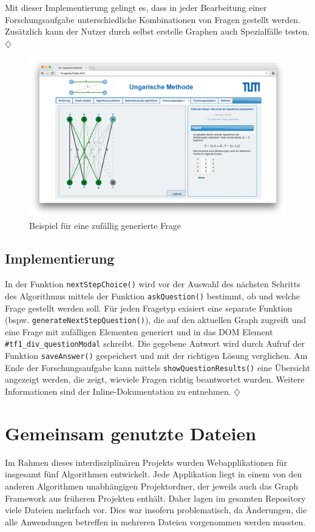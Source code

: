 Mit dieser Implementierung gelingt es, dass in jeder Bearbeitung einer Forschungsaufgabe unterschiedliche Kombinationen von Fragen gestellt werden. Zusätzlich kann der Nutzer durch selbst erstelle Graphen auch Spezialfälle testen. \hfill$\diamondsuit$

\begin{figure}[h!]
	\centering
	\includegraphics[width=\textwidth]{figures/random_question}
	\caption[Zufällig generierte Frage]{Beispiel für eine zufällig generierte Frage}\label{fig:random-question}
\end{figure}

\subsection*{Implementierung} %
In der Funktion \texttt{nextStepChoice()} wird vor der Auswahl des nächsten Schritts des Algorithmus mittels der Funktion \texttt{askQuestion()} bestimmt, ob und welche Frage gestellt werden soll. Für jeden Fragetyp exisiert eine separate Funktion (bspw. \texttt{generateNextStepQuestion()}), die auf den aktuellen Graph zugreift und eine Frage mit zufälligen Elementen generiert und in das DOM Element \texttt{\#tf1\_div\_questionModal} schreibt. Die gegebene Antwort wird durch Aufruf der Funktion \texttt{saveAnswer()} gespeichert und mit der richtigen Lösung verglichen. Am Ende der Forschungsaufgabe kann mittels \texttt{showQuestionResults()} eine Übersicht angezeigt werden, die zeigt, wieviele Fragen richtig beantwortet wurden. Weitere Informationen sind der Inline-Dokumentation zu entnehmen. \hfill$\diamondsuit$

\section{Gemeinsam genutzte Dateien} %
Im Rahmen dieses interdisziplinären Projekts wurden Webapplikationen für insgesamt fünf Algorithmen entwickelt. Jede Applikation liegt in einem von den anderen Algorithmen unabhängigen Projektordner, der jeweils auch das Graph Framework aus früheren Projekten enthält. Daher lagen im gesamten Repository viele Dateien mehrfach vor. Dies war insofern problematisch, da Änderungen, die alle Anwendungen betreffen in mehreren Dateien vorgenommen werden mussten.

